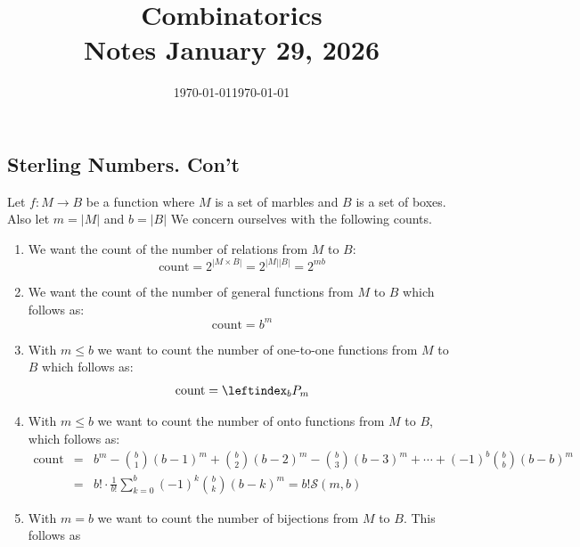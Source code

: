 \documentclass[12pt]{amsart}
\title{Combinatorics\\Notes January 29, 2026}
\date{\today}
\theoremstyle{definition}
\begin{document}
    \maketitle
    \date{\today}
    \begin{onehalfspace}
        \section{Sterling Numbers. Con't}
        Let $f:M\rightarrow B$ be a function where $M$ is a set of marbles and $B$ is a set of boxes.
        Also let $m = |M|$ and $b = |B|$
        We concern ourselves with the following counts.
        \begin{enumerate}
            \item We want the count of the number of relations from $M$ to $B$:
                \begin{displaymath}
                    \text{count} = 2^{|M\times B|} = 2^{|M||B|} = 2^{mb}
                \end{displaymath}
            \item We want the count of the number of general functions from $M$ to $B$ which follows as:
                \begin{displaymath}
                    \text{count} = b^m
                \end{displaymath}
            \item With $m\leq b$ we want to count the number of one-to-one functions from $M$ to $B$ which follows
                  as:
                \begin{displaymath}
                    \text{count} = \leftindex_b P_m
                \end{displaymath}
            \item With $m \leq b$ we want to count the number of onto functions from $M$ to $B$, which follows as:
                \begin{eqnarray*}
                    \text{count} & = & b^m - \binom{b}{1}(b-1)^m + \binom{b}{2}(b-2)^m - \binom{b}{3}(b-3)^m + \cdots + (-1)^b\binom{b}{b}(b - b)^m \\
                                 & = & b! \cdot \frac{1}{b!} \sum_{k=0}^b (-1)^k\binom{b}{k}(b-k)^m = b!\mathcal{S}(m,b)
                \end{eqnarray*}
            \item With $m = b $ we want to count the number of bijections from $M$ to $B$. This follows as
                \begin{displaymath}

\end{displaymath}
\end{enumerate}
\end{onehalfspace}
\end{document}
